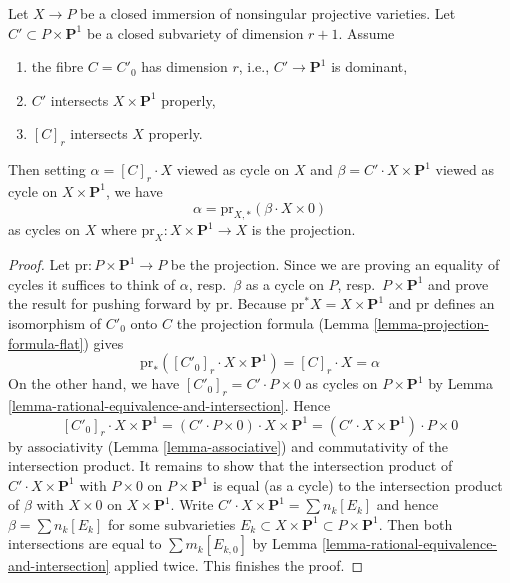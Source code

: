 \begin{lemma}
\label{lemma-transfer}
Let $X \to P$ be a closed immersion of nonsingular projective varieties.
Let $C' \subset P \times \mathbf{P}^1$ be a closed subvariety of dimension
$r + 1$. Assume
\begin{enumerate}
\item the fibre $C = C'_0$ has dimension $r$, i.e., $C' \to \mathbf{P}^1$
is dominant,
\item $C'$ intersects $X \times \mathbf{P}^1$ properly,
\item $[C]_r$ intersects $X$ properly.
\end{enumerate}
Then setting $\alpha = [C]_r \cdot X$ viewed as cycle on $X$ and
$\beta = C' \cdot X \times \mathbf{P}^1$ viewed as cycle on
$X \times \mathbf{P}^1$, we have
$$
\alpha = \text{pr}_{X, *}(\beta \cdot X \times 0)
$$
as cycles on $X$ where $\text{pr}_X : X \times \mathbf{P}^1 \to X$ is the
projection.
\end{lemma}

\begin{proof}
Let $\text{pr} : P \times \mathbf{P}^1 \to P$ be the projection.
Since we are proving an equality of cycles it suffices to think of
$\alpha$, resp.\ $\beta$ as a cycle on $P$, resp.\ $P \times \mathbf{P}^1$
and prove the result for pushing forward by $\text{pr}$.
Because $\text{pr}^*X = X \times \mathbf{P}^1$ and
$\text{pr}$ defines an isomorphism of $C'_0$ onto $C$
the projection formula (Lemma \ref{lemma-projection-formula-flat})
gives
$$
\text{pr}_*([C'_0]_r \cdot X \times \mathbf{P}^1) = [C]_r \cdot X = \alpha
$$
On the other hand, we have $[C'_0]_r = C' \cdot P \times 0$
as cycles on $P \times \mathbf{P}^1$
by Lemma \ref{lemma-rational-equivalence-and-intersection}.
Hence
$$
[C'_0]_r \cdot X \times \mathbf{P}^1 =
(C' \cdot P \times 0) \cdot X \times \mathbf{P}^1 =
(C' \cdot X \times \mathbf{P}^1) \cdot P \times 0
$$
by associativity (Lemma \ref{lemma-associative}) and commutativity of the
intersection product. It remains to show that the intersection product of
$C' \cdot X \times \mathbf{P}^1$ with $P \times 0$ on
$P \times \mathbf{P}^1$ is equal (as a cycle) to the intersection product of
$\beta$ with $X \times 0$ on $X \times \mathbf{P}^1$. Write
$C' \cdot X \times \mathbf{P}^1 = \sum n_k[E_k]$ and hence
$\beta = \sum n_k[E_k]$ for some subvarieties
$E_k \subset X \times \mathbf{P}^1 \subset P \times \mathbf{P}^1$.
Then both intersections are equal to $\sum m_k[E_{k, 0}]$ by
Lemma \ref{lemma-rational-equivalence-and-intersection} applied twice.
This finishes the proof.
\end{proof}




